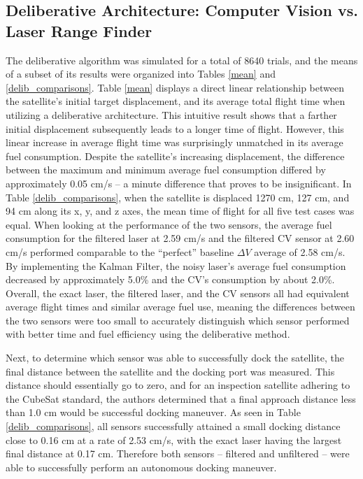 \documentclass[journal, 10pt]{IEEEtran}
\begin{document}
\subsection{Deliberative Architecture: Computer Vision vs. Laser Range Finder}

The deliberative algorithm was simulated for a total of 8640 trials, and the means of a subset of its results were organized into Tables \ref{mean} and \ref{delib_comparisons}. Table \ref{mean} displays a direct linear relationship between the satellite's initial target displacement, and its average total flight time when utilizing a deliberative architecture. This intuitive result shows that a farther initial displacement subsequently leads to a longer time of flight. However, this linear increase in average flight time was surprisingly unmatched in its average fuel consumption. Despite the satellite's increasing displacement, the difference between the maximum and minimum average fuel consumption differed by approximately 0.05 cm/s -- a minute difference that proves to be insignificant. In Table \ref{delib_comparisons}, when the satellite is displaced 1270 cm, 127 cm, and 94 cm along its x, y, and z axes, the mean time of flight for all five test cases was equal. When looking at the performance of the two sensors, the average fuel consumption for the filtered laser at 2.59 cm/s and the filtered CV sensor at 2.60 cm/s performed comparable to the ``perfect'' baseline $\Delta V$ average of 2.58 cm/s. By implementing the Kalman Filter, the noisy laser's average fuel consumption decreased by approximately 5.0\% and the CV's consumption by about 2.0\%. Overall, the exact laser, the filtered laser, and the CV sensors all had equivalent average flight times and similar average fuel use, meaning the differences between the two sensors were too small to accurately distinguish which sensor performed with better time and fuel efficiency using the deliberative method.

Next, to determine which sensor was able to successfully dock the satellite, the final distance between the satellite and the docking port was measured. This distance should essentially go to zero, and for an inspection satellite adhering to the CubeSat standard, the authors determined that a final approach distance less than 1.0 cm would be successful docking maneuver. As seen in Table \ref{delib_comparisons}, all sensors successfully attained a small docking distance close to 0.16 cm at a rate of 2.53 cm/s, with the exact laser having the largest final distance at 0.17 cm. Therefore both sensors -- filtered and unfiltered -- were able to successfully perform an autonomous docking maneuver. 
\end{document}
